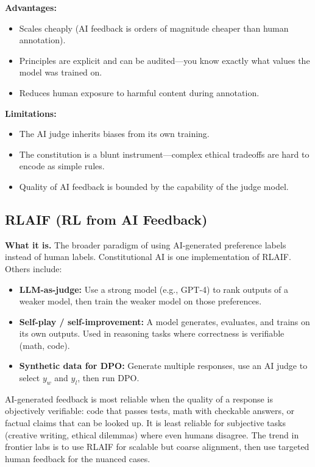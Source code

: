 \textbf{Advantages:}
\begin{itemize}
    \item Scales cheaply (AI feedback is orders of magnitude cheaper than human annotation).
    \item Principles are explicit and can be audited---you know exactly what values the model was trained on.
    \item Reduces human exposure to harmful content during annotation.
\end{itemize}

\textbf{Limitations:}
\begin{itemize}
    \item The AI judge inherits biases from its own training.
    \item The constitution is a blunt instrument---complex ethical tradeoffs are hard to encode as simple rules.
    \item Quality of AI feedback is bounded by the capability of the judge model.
\end{itemize}

\subsection{RLAIF (RL from AI Feedback)}

\textbf{What it is.} The broader paradigm of using AI-generated preference labels instead of human labels. Constitutional AI is one implementation of RLAIF. Others include:

\begin{itemize}
    \item \textbf{LLM-as-judge:} Use a strong model (e.g., GPT-4) to rank outputs of a weaker model, then train the weaker model on those preferences.
    \item \textbf{Self-play / self-improvement:} A model generates, evaluates, and trains on its own outputs. Used in reasoning tasks where correctness is verifiable (math, code).
    \item \textbf{Synthetic data for DPO:} Generate multiple responses, use an AI judge to select $y_w$ and $y_l$, then run DPO.
\end{itemize}

\begin{keyinsight}
AI-generated feedback is most reliable when the quality of a response is objectively verifiable: code that passes tests, math with checkable answers, or factual claims that can be looked up. It is least reliable for subjective tasks (creative writing, ethical dilemmas) where even humans disagree. The trend in frontier labs is to use RLAIF for scalable but coarse alignment, then use targeted human feedback for the nuanced cases.
\end{keyinsight}

